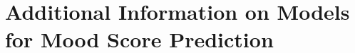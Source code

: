 \chapter{Additional Information on Models for Mood Score Prediction}
\label{chapter:appendix_depression}
\glsresetall


